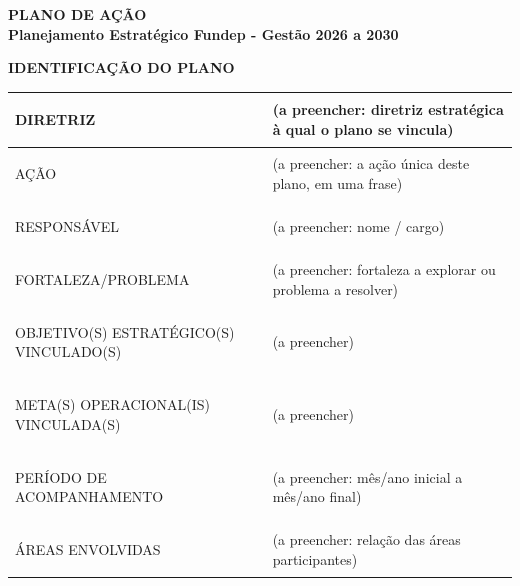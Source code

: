 \documentclass[12pt,a4paper]{article}
\newcommand{\PlanoVersao}{0.1}
\newcommand{\secao}[1]{%
  \par\vspace{\dimexpr16pt-\parskip\relax}%
  {\noindent\bfseries\color{azulTitulo}\fontsize{13}{16}\selectfont #1}%
  \par\vspace{\dimexpr8pt-\parskip\relax}%
}
\newlength{\utilTab}
\newlength{\colIdRot}\newlength{\colIdVal}
\begin{document}
\thispagestyle{empty}


\begin{center}
  \singlespacing
  {\bfseries\color{azulTitulo}\fontsize{17}{20}\selectfont PLANO DE AÇÃO}\\[6pt]
  {\bfseries\color{azulTitulo}\fontsize{13}{16}\selectfont Planejamento Estratégico Fundep - Gestão 2026 a 2030}
\end{center}

\secao{IDENTIFICAÇÃO DO PLANO}

\begingroup
\footnotesize\singlespacing
{}
\setlength{\arrayrulewidth}{1pt}
\setlength{\tabcolsep}{5.4pt}
\renewcommand{\arraystretch}{1.45}
\setlength{\utilTab}{\dimexpr\textwidth-4\tabcolsep-3\arrayrulewidth\relax}
\setlength{\colIdRot}{0.2819\utilTab}
\setlength{\colIdVal}{\dimexpr\utilTab-\colIdRot\relax}
\begin{tabular}{|>{\cellcolor{azulClaro}\bfseries\raggedright\arraybackslash}p{\colIdRot}|>{\raggedright\arraybackslash}p{\colIdVal}|}
\hline
DIRETRIZ & (a preencher: diretriz estratégica à qual o plano se vincula) \\
\hline
AÇÃO & (a preencher: a ação única deste plano, em uma frase) \\
\hline
RESPONSÁVEL & (a preencher: nome / cargo) \\
\hline
FORTALEZA/PROBLEMA & (a preencher: fortaleza a explorar ou problema a resolver) \\
\hline
OBJETIVO(S) ESTRATÉGICO(S) VINCULADO(S) & (a preencher) \\
\hline
META(S) OPERACIONAL(IS) VINCULADA(S) & (a preencher) \\
\hline
PERÍODO DE ACOMPANHAMENTO & (a preencher: mês/ano inicial a mês/ano final) \\
\hline
ÁREAS ENVOLVIDAS & (a preencher: relação das áreas participantes) \\
\hline
\end{tabular}
\endgroup
\end{document}
